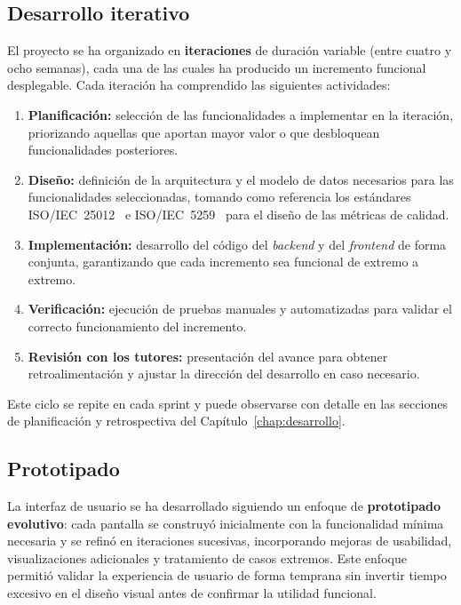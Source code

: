 \subsection{Desarrollo iterativo}

El proyecto se ha organizado en \textbf{iteraciones} de duración variable
(entre cuatro y ocho semanas), cada una de las cuales ha producido un
incremento funcional desplegable.  Cada iteración ha comprendido las
siguientes actividades:

\begin{enumerate}
  \item \textbf{Planificación:} selección de las funcionalidades a
    implementar en la iteración, priorizando aquellas que aportan mayor valor
    o que desbloquean funcionalidades posteriores.

  \item \textbf{Diseño:} definición de la arquitectura y el modelo de datos
    necesarios para las funcionalidades seleccionadas, tomando como referencia
    los estándares \ac{ISO}/\ac{IEC}~25012~\citep{iso25012} e
    \ac{ISO}/\ac{IEC}~5259~\citep{iso5259} para el diseño de las métricas de
    calidad.

  \item \textbf{Implementación:} desarrollo del código del \emph{backend} y
    del \emph{frontend} de forma conjunta, garantizando que cada incremento
    sea funcional de extremo a extremo.

  \item \textbf{Verificación:} ejecución de pruebas manuales y automatizadas
    para validar el correcto funcionamiento del incremento.

  \item \textbf{Revisión con los tutores:} presentación del avance para
    obtener retroalimentación y ajustar la dirección del desarrollo en caso
    necesario.
\end{enumerate}

Este ciclo se repite en cada sprint y puede observarse con detalle en las
secciones de planificación y retrospectiva del
Capítulo~\ref{chap:desarrollo}.

\subsection{Prototipado}

La interfaz de usuario se ha desarrollado siguiendo un enfoque de
\textbf{prototipado evolutivo}: cada pantalla se construyó inicialmente
con la funcionalidad mínima necesaria y se refinó en iteraciones sucesivas,
incorporando mejoras de usabilidad, visualizaciones adicionales y tratamiento
de casos extremos.  Este enfoque permitió validar la experiencia de usuario
de forma temprana sin invertir tiempo excesivo en el diseño visual antes de
confirmar la utilidad funcional.

